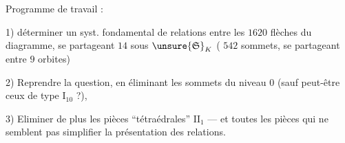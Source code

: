 Programme de travail :

1) déterminer un syst. fondamental de relations entre les \(1620\) flèches du diagramme, se partageant  \(14\)  sous \(\unsure{\mathfrak S}_K\) ( \(542\) sommets, se partageant entre \(9\) orbites)



2) Reprendre la question, en éliminant les sommets du niveau \(0\) (sauf peut-être ceux de type \(\mathrm I_{10}\) ?),

3) Eliminer de plus les pièces  ``tétraédrales'' \(\mathrm{II}_1\) --- et toutes les pièces qui ne semblent pas simplifier la présentation des relations.

